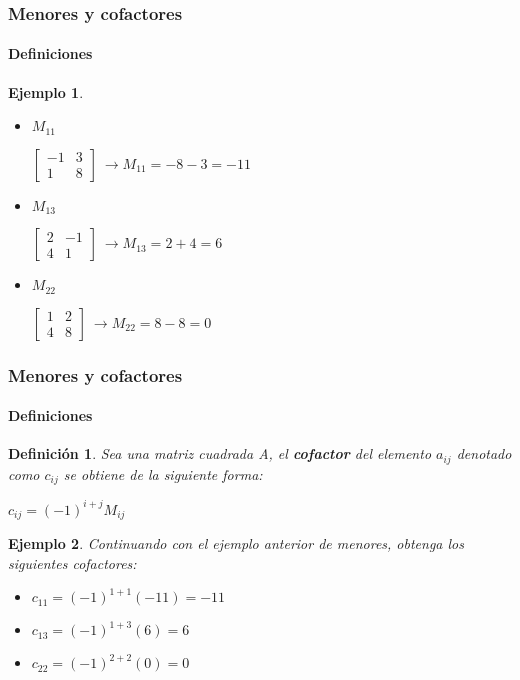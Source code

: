 \documentclass[11pt]{beamer}
\newtheorem{defi}{Definición}
\newtheorem{ejem}{Ejemplo}
\begin{document}
\begin{frame}
\frametitle{Menores y cofactores}
\framesubtitle{Definiciones}
\begin{ejem}
\begin{itemize}
\item $M_{11}$ \\
\begin{center}
${\displaystyle {\begin{bmatrix}-1&3\\1&8\end{bmatrix}}} ~ \rightarrow M_{11} = -8-3=-11$
\end{center}
\item $M_{13}$ \\
\begin{center}
${\displaystyle {\begin{bmatrix}2&-1\\4&1\end{bmatrix}}} ~ \rightarrow M_{13} = 2+4=6$
\end{center}
\item $M_{22}$ \\
\begin{center}
${\displaystyle {\begin{bmatrix}1&2\\4&8\end{bmatrix}}} ~ \rightarrow M_{22} = 8-8=0$
\end{center}
\end{itemize}
\end{ejem}
\end{frame}

\begin{frame}
\frametitle{Menores y cofactores}
\framesubtitle{Definiciones}
\begin{defi}
Sea una matriz cuadrada A, el \textbf{cofactor} del elemento $a_{ij}$ denotado como $c_{ij}$ se obtiene de la siguiente forma: \\
\begin{center}
$c_{ij} = (-1)^{i+j}M_{ij}$
\end{center}
\end{defi}
\begin{ejem}
Continuando con el ejemplo anterior de menores, obtenga los siguientes cofactores:\\
\begin{itemize}
\item $c_{11} = (-1)^{1+1}(-11) = -11$
\item $c_{13} = (-1)^{1+3}(6) = 6$
\item $c_{22} = (-1)^{2+2}(0) = 0$
\end{itemize}
\end{ejem}
\end{frame}
\end{document}
